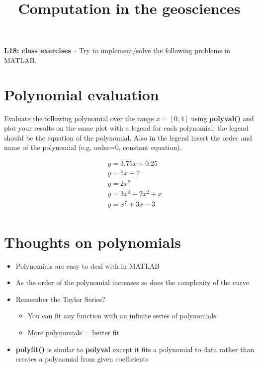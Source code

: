 \documentclass[10pt,fleqn]{article}
\title{Computation in the geosciences}
\date{\empty}
\begin{document}
\textbf{L18: class exercises} -- Try to implement/solve the following problems in MATLAB.


\section*{Polynomial evaluation}

Evaluate the following polynomial over the range $x=[0,4]$ using \textbf{polyval()} and plot your results on the same plot with a legend for each polynomial; the legend should be the equation of the polynomial. Also in the legend insert the order and name of the polynomial (e.g. order=0, constant equation).

\begin{eqnarray} \nonumber
&& y = 3.75x + 0.25 \\ \nonumber
&& y = 5x + 7 \\ \nonumber
&& y = 2x^2 \\ \nonumber
&& y = 3x^3 + 2x^2 + x\\ \nonumber
&& y = x^7 + 3x - 3 \\ \nonumber
\end{eqnarray}

\section*{Thoughts on polynomials}


\begin{itemize}
	\item Polynomials are easy to deal with in MATLAB
	\item As the order of the polynomial increases so does the complexity of the curve
	\item Remember the Taylor Series?
	\begin{itemize}
		\item You can fit any function with an infinite series of polynomials
		\item More polynomials = better fit
	\end{itemize}
	\item \textbf{polyfit()} is similar to \textbf{polyval} except it fits a polynomial to data rather than creates a polynomial from given coefficients
\end{itemize}
\end{document}
